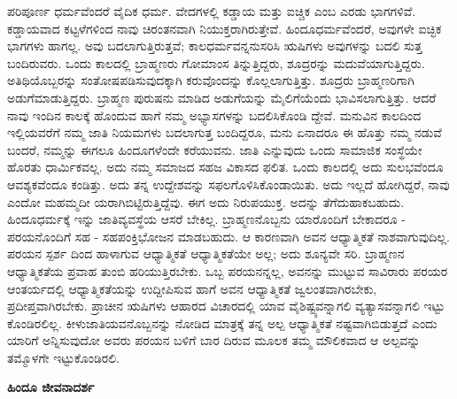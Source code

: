 ಪರಿಪೂರ್ಣ ಧರ್ಮವೆಂದರೆ ವೈದಿಕ ಧರ್ಮ. ವೇದಗಳಲ್ಲಿ ಕಡ್ಡಾಯ ಮತ್ತು ಐಚ್ಚಿಕ ಎಂಬ ಎರಡು ಭಾಗಗಳಿವೆ. ಕಡ್ಡಾಯವಾದ ಕಟ್ಟಳೆಗಳಿಂದ ನಾವು ಚಿರಂತನವಾಗಿ ನಿಯುಕ್ತರಾಗಿರುತ್ತೇವೆ. ಹಿಂದೂಧರ್ಮವೆಂದರೆ, ಅವುಗಳೇ ಐಚ್ಛಿಕ ಭಾಗಗಳು ಹಾಗಲ್ಲ. ಅವು ಬದಲಾಗುತ್ತಿರುತ್ತವೆ; ಕಾಲಧರ್ಮವನ್ನನುಸರಿಸಿ ಋಷಿಗಳು ಅವುಗಳನ್ನು ಬದಲಿ ಸುತ್ತ ಬಂದಿರುವರು. ಒಂದು ಕಾಲದಲ್ಲಿ ಬ್ರಾಹ್ಮಣರು ಗೋಮಾಂಸ ತಿನ್ನುತ್ತಿದ್ದರು, ಶೂದ್ರರನ್ನು ಮದುವೆಯಾಗುತ್ತಿದ್ದರು. ಅತಿಥಿಯೊಬ್ಬರನ್ನು ಸಂತೋಷಪಡಿಸುವುದಕ್ಕಾಗಿ ಕರುವೊಂದನ್ನು ಕೊಲ್ಲಲಾಗುತ್ತಿತ್ತು. ಶೂದ್ರರು ಬ್ರಾಹ್ಮಣರಿಗಾಗಿ ಅಡುಗೆಮಾಡುತ್ತಿದ್ದರು. ಬ್ರಾಹ್ಮಣ ಪುರುಷನು ಮಾಡಿದ ಅಡುಗೆಯನ್ನು ಮೈಲಿಗೆಯೆಂದು ಭಾವಿಸಲಾಗುತ್ತಿತ್ತು. ಆದರೆ ನಾವು ಇಂದಿನ ಕಾಲಕ್ಕೆ ಹೊಂದುವ ಹಾಗೆ ನಮ್ಮ ಅಭ್ಯಾಸಗಳನ್ನು ಬದಲಿಸಿಕೊಂಡಿ ದ್ದೇವೆ. ಮನುವಿನ ಕಾಲದಿಂದ ಇಲ್ಲಿಯವರೆಗೆ ನಮ್ಮ ಜಾತಿ ನಿಯಮಗಳು ಬದಲಾಗುತ್ತ ಬಂದಿದ್ದರೂ, ಮನು ಏನಾದರೂ ಈ ಹೊತ್ತು ನಮ್ಮ ನಡುವೆ ಬಂದರೆ, ನಮ್ಮನ್ನು ಈಗಲೂ ಹಿಂದೂಗಳೆಂದೇ ಕರೆಯುವನು. ಜಾತಿ ಎನ್ನುವುದು ಒಂದು ಸಾಮಾಜಿಕ ಸಂಸ್ಥೆಯೇ ಹೊರತು ಧಾರ್ಮಿಕವಲ್ಲ. ಅದು ನಮ್ಮ ಸಮಾಜದ ಸಹಜ ವಿಕಾಸದ ಫಲಿತ. ಒಂದು ಕಾಲದಲ್ಲಿ ಅದು ಸುಲಭವೆಂದೂ ಆವಶ್ಯಕವೆಂದೂ ಕಂಡಿತ್ತು. ಅದು ತನ್ನ ಉದ್ದೇಶವನ್ನು ಸಫಲಗೊಳಿಸಿಕೊಂಡಾಯಿತು. ಅದು ಇಲ್ಲದೆ ಹೋಗಿದ್ದರೆ, ನಾವು ಎಂದೋ ಮಹಮ್ಮದೀ ಯರಾಗಿಬಿಟ್ಟಿರುತ್ತಿದ್ದೆವು. ಈಗ ಅದು ನಿರುಪಯುಕ್ತ. ಅದನ್ನು ತೆಗೆದುಹಾಕಬಹುದು. ಹಿಂದೂಧರ್ಮಕ್ಕೆ ಇನ್ನು ಜಾತಿವ್ಯವಸ್ಥೆಯ ಆಸರೆ ಬೇಕಿಲ್ಲ. ಬ್ರಾಹ್ಮಣನೊಬ್ಬನು ಯಾರೊಂದಿಗೆ ಬೇಕಾದರೂ - ಪರಯನೊಂದಿಗೆ ಸಹ - ಸಹಪಂಕ್ತಿಭೋಜನ ಮಾಡಬಹುದು. ಆ ಕಾರಣವಾಗಿ ಅವನ ಆಧ್ಯಾತ್ಮಿಕತೆ ನಾಶವಾಗುವುದಿಲ್ಲ. ಪರಯನ ಸ್ಪರ್ಶ ದಿಂದ ಹಾಳಾಗುವ ಆಧ್ಯಾತ್ಮಿಕತೆ ಆಧ್ಯಾತ್ಮಿಕತೆಯೇ ಅಲ್ಲ; ಅದು ಶೂನ್ಯವೇ ಸರಿ. ಬ್ರಾಹ್ಮಣನ ಆಧ್ಯಾತ್ಮಿಕತೆಯ ಪ್ರವಾಹ ತುಂಬಿ ಹರಿಯುತ್ತಿರಬೇಕು. ಒಬ್ಬ ಪರಯನನ್ನಲ್ಲ, ಅವನನ್ನು ಮುಟ್ಟುವ ಸಾವಿರಾರು ಪರಯರ ಆಂತರ್ಯದಲ್ಲಿ ಆಧ್ಯಾತ್ಮಿಕತೆಯನ್ನು ಉದ್ದೀಪಿಸುವ ಹಾಗೆ ಅವನ ಆಧ್ಯಾತ್ಮಿಕತೆ ಜ್ವಲಂತವಾಗಿರಬೇಕು, ಪ್ರದೀಪ್ತವಾಗಿರಬೇಕು. ಪ್ರಾಚೀನ ಋಷಿಗಳು ಆಹಾರದ ವಿಚಾರದಲ್ಲಿ ಯಾವ ವೈಶಿಷ್ಟ್ಯವನ್ನಾಗಲಿ ವ್ಯತ್ಯಾಸವನ್ನಾಗಲಿ ಇಟ್ಟು ಕೊಂಡಿರಲಿಲ್ಲ. ಕೀಳುಜಾತಿಯವನೊಬ್ಬನನ್ನು ನೋಡಿದ ಮಾತ್ರಕ್ಕೆ ತನ್ನ ಅಲ್ಪ ಆಧ್ಯಾತ್ಮಿಕತೆ ನಷ್ಟವಾಗಿಬಿಡುತ್ತದೆ ಎಂದು ಯಾರಿಗೆ ಅನ್ನಿಸುವುದೋ ಅವರು ಪರಯನ ಬಳಿಗೆ ಬಾರ ದಿರುವ ಮೂಲಕ ತಮ್ಮ ಮೌಲಿಕವಾದ ಆ ಅಲ್ಪವನ್ನು ತಮ್ಮೊಳಗೇ ಇಟ್ಟುಕೊಂಡಿರಲಿ.

\begin{center}
\textbf{ಹಿಂದೂ ಜೀವನಾದರ್ಶ}
\end{center}

